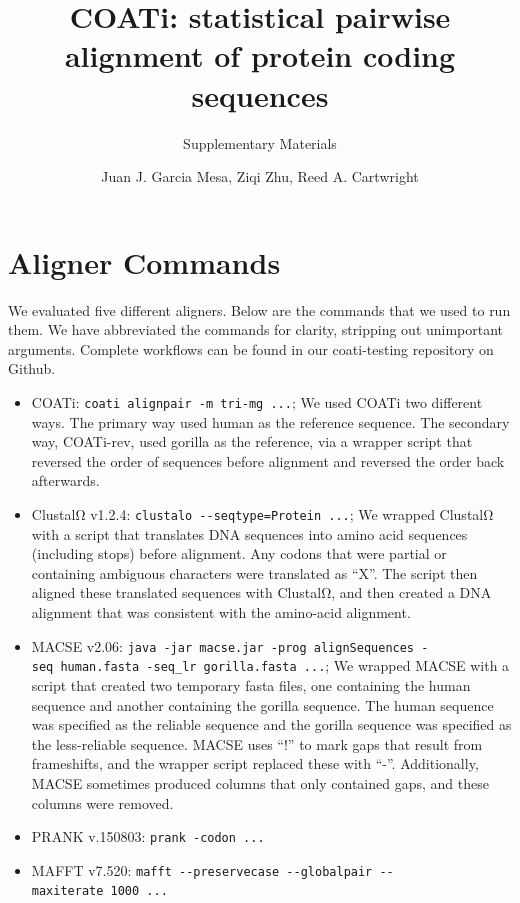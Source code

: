 \documentclass[
]{article}
\title{COATi: statistical pairwise alignment of protein coding sequences}
\subtitle{Supplementary Materials}
\author{Juan J. Garcia Mesa, Ziqi Zhu, Reed A. Cartwright}
\date{}
\providecommand{\tightlist}{%
  \setlength{\itemsep}{0pt}\setlength{\parskip}{0pt}}
\begin{document}
\maketitle

{
\setcounter{tocdepth}{2}
\tableofcontents
}
\hypertarget{aligner-commands}{%
\section{Aligner Commands}\label{aligner-commands}}

We evaluated five different aligners. Below are the commands that we used to run them. We have abbreviated the commands for clarity, stripping out unimportant arguments. Complete workflows can be found in our coati-testing repository on Github.

\begin{itemize}
\tightlist
\item
  COATi: \texttt{coati\ alignpair\ -m\ tri-mg\ ...}; We used COATi two different ways. The primary way used human as the reference sequence. The secondary way, COATi-rev, used gorilla as the reference, via a wrapper script that reversed the order of sequences before alignment and reversed the order back afterwards.
\item
  ClustalΩ v1.2.4: \texttt{clustalo\ -\/-seqtype=Protein\ ...}; We wrapped ClustalΩ with a script that translates DNA sequences into amino acid sequences (including stops) before alignment. Any codons that were partial or containing ambiguous characters were translated as ``X''. The script then aligned these translated sequences with ClustalΩ, and then created a DNA alignment that was consistent with the amino-acid alignment.
\item
  MACSE v2.06: \texttt{java\ -jar\ macse.jar\ -prog\ alignSequences\ -seq\ human.fasta\ -seq\_lr\ gorilla.fasta\ ...}; We wrapped MACSE with a script that created two temporary fasta files, one containing the human sequence and another containing the gorilla sequence. The human sequence was specified as the reliable sequence and the gorilla sequence was specified as the less-reliable sequence. MACSE uses ``!'' to mark gaps that result from frameshifts, and the wrapper script replaced these with ``-''. Additionally, MACSE sometimes produced columns that only contained gaps, and these columns were removed.
\item
  PRANK v.150803: \texttt{prank\ -codon\ ...}
\item
  MAFFT v7.520: \texttt{mafft\ -\/-preservecase\ -\/-globalpair\ -\/-maxiterate\ 1000\ ...}
\end{itemize}
\end{document}
